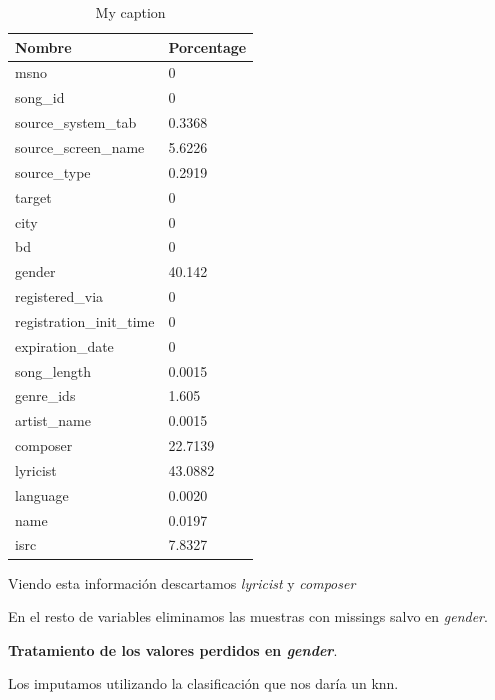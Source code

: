 \documentclass[a4paper]{article}
\begin{document}
\begin{table}[H]
\centering
\caption{My caption}
\label{my-label}
\begin{tabular}{|l|l|}
\hline
Nombre                   & Porcentage \\ \hline
msno                     & 0          \\ \hline
song\_id                 & 0          \\ \hline
source\_system\_tab      & 0.3368     \\ \hline
source\_screen\_name     & 5.6226     \\ \hline
source\_type             & 0.2919     \\ \hline
target                   & 0          \\ \hline
city                     & 0          \\ \hline
bd                       & 0          \\ \hline
gender                   & 40.142     \\ \hline
registered\_via          & 0          \\ \hline
registration\_init\_time & 0          \\ \hline
expiration\_date         & 0          \\ \hline
song\_length             & 0.0015     \\ \hline
genre\_ids               & 1.605      \\ \hline
artist\_name             & 0.0015     \\ \hline
composer                 & 22.7139    \\ \hline
lyricist                 & 43.0882    \\ \hline
language                 & 0.0020     \\ \hline
name                     & 0.0197     \\ \hline
isrc                     & 7.8327     \\ \hline
\end{tabular}
\end{table}


Viendo esta información descartamos \textit{lyricist} y \textit{composer}

En el resto de variables eliminamos las muestras con missings salvo en \textit{gender}. 

\textbf{Tratamiento de los valores perdidos en \textit{gender}}.

Los imputamos utilizando la clasificación que nos daría un knn.
\end{document}
